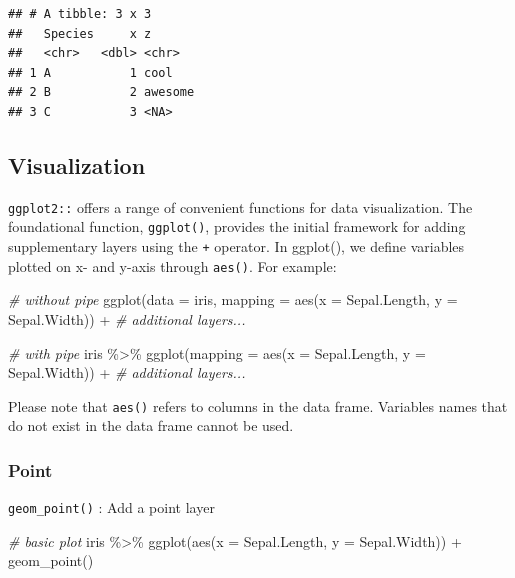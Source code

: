 \documentclass[
]{article}
\newenvironment{Shaded}{\begin{snugshade}}{\end{snugshade}}
\newcommand{\AttributeTok}[1]{\textcolor[rgb]{0.77,0.63,0.00}{#1}}
\newcommand{\CommentTok}[1]{\textcolor[rgb]{0.56,0.35,0.01}{\textit{#1}}}
\newcommand{\FunctionTok}[1]{\textcolor[rgb]{0.00,0.00,0.00}{#1}}
\newcommand{\NormalTok}[1]{#1}
\newcommand{\SpecialCharTok}[1]{\textcolor[rgb]{0.00,0.00,0.00}{#1}}
\begin{document}
\begin{verbatim}
## # A tibble: 3 x 3
##   Species     x z      
##   <chr>   <dbl> <chr>  
## 1 A           1 cool   
## 2 B           2 awesome
## 3 C           3 <NA>
\end{verbatim}

\hypertarget{visualization}{%
\subsection{Visualization}\label{visualization}}

\texttt{ggplot2::} offers a range of convenient functions for data visualization. The foundational function, \texttt{ggplot()}, provides the initial framework for adding supplementary layers using the \texttt{+} operator. In ggplot(), we define variables plotted on x- and y-axis through \texttt{aes()}. For example:

\begin{Shaded}
\begin{Highlighting}[]
\CommentTok{\# without pipe}
\FunctionTok{ggplot}\NormalTok{(}\AttributeTok{data =}\NormalTok{ iris,}
       \AttributeTok{mapping =} \FunctionTok{aes}\NormalTok{(}\AttributeTok{x =}\NormalTok{ Sepal.Length,}
                     \AttributeTok{y =}\NormalTok{ Sepal.Width)) }\SpecialCharTok{+}
  \CommentTok{\# additional layers...}

\CommentTok{\# with pipe}
\NormalTok{iris }\SpecialCharTok{\%\textgreater{}\%} 
  \FunctionTok{ggplot}\NormalTok{(}\AttributeTok{mapping =} \FunctionTok{aes}\NormalTok{(}\AttributeTok{x =}\NormalTok{ Sepal.Length,}
                       \AttributeTok{y =}\NormalTok{ Sepal.Width)) }\SpecialCharTok{+}
  \CommentTok{\# additional layers...  }
\end{Highlighting}
\end{Shaded}

Please note that \texttt{aes()} refers to columns in the data frame. Variables names that do not exist in the data frame cannot be used.

\hypertarget{point}{%
\subsubsection{Point}\label{point}}

\texttt{geom\_point()} : Add a point layer

\begin{Shaded}
\begin{Highlighting}[]
\CommentTok{\# basic plot}
\NormalTok{iris }\SpecialCharTok{\%\textgreater{}\%} 
  \FunctionTok{ggplot}\NormalTok{(}\FunctionTok{aes}\NormalTok{(}\AttributeTok{x =}\NormalTok{ Sepal.Length,}
             \AttributeTok{y =}\NormalTok{ Sepal.Width)) }\SpecialCharTok{+}
  \FunctionTok{geom\_point}\NormalTok{()}
\end{Highlighting}
\end{Shaded}
\end{document}
